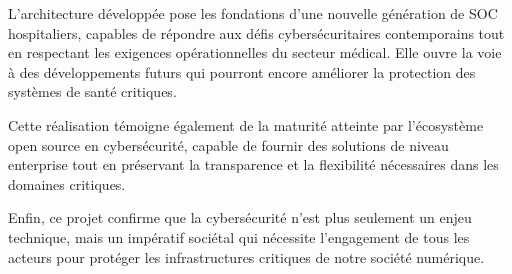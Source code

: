 L'architecture développée pose les fondations d'une nouvelle génération de SOC hospitaliers, capables de répondre aux défis cybersécuritaires contemporains tout en respectant les exigences opérationnelles du secteur médical. Elle ouvre la voie à des développements futurs qui pourront encore améliorer la protection des systèmes de santé critiques.

Cette réalisation témoigne également de la maturité atteinte par l'écosystème open source en cybersécurité, capable de fournir des solutions de niveau enterprise tout en préservant la transparence et la flexibilité nécessaires dans les domaines critiques.

Enfin, ce projet confirme que la cybersécurité n'est plus seulement un enjeu technique, mais un impératif sociétal qui nécessite l'engagement de tous les acteurs pour protéger les infrastructures critiques de notre société numérique.

\newpage
